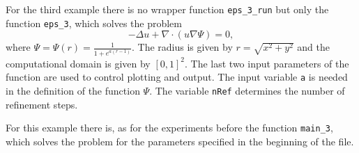 For the third example there is no wrapper function \texttt{eps\_3\_run} but only the function \texttt{eps\_3}, which solves the problem
\begin{equation}
 -\Delta u + \nabla\cdot(u\nabla\Psi) = 0,
\end{equation}
where $\Psi=\Psi(r)=\tfrac{1}{1+e^{a(r-1)}}$. The radius is given by $r=\sqrt{x^2+y^2}$ and the computational domain is given by $[0,1]^2$. The last two input parameters of the function are used to control plotting and output. The input variable \texttt{a} is needed in the definition of the function $\Psi$. The variable \texttt{nRef} determines the number of refinement steps.


For this example there is, as for the experiments before the function \texttt{main\_3}, which solves the problem for the parameters specified in the beginning of the file.
